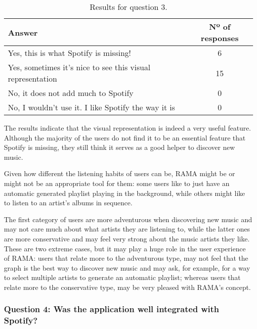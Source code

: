       \begin{table}[H]
         \begin{center}
           \begin{tabular}{l|c}
       
           \hline
           \textbf{Answer} & \textbf{Nº of responses} \\
           \hline

           \hline
            Yes, this is what Spotify is missing! & 6 \\
            Yes, sometimes it's nice to see this visual representation & 15 \\
            No, it does not add much to Spotify & 0 \\
            No, I wouldn't use it. I like Spotify the way it is & 0 \\
           \hline
           \end{tabular}
         \end{center}
         \caption{Results for question 3.}
         \label{tab:question3}
       \end{table}

      The results indicate that the visual representation is indeed a very useful feature.
      Although the majority of the users do not find it to be an essential feature that Spotify is missing, they still think it serves as a good helper to discover new music.

      Given how different the listening habits of users can be, RAMA might be or might not be an appropriate tool for them: some users like to just have an automatic generated playlist playing in the background, while others might like to listen to an artist's albums in sequence.

      The first category of users are more adventurous when discovering new music and may not care much about what artists they are listening to, while the latter ones are more conservative and may feel very strong about the music artists they like.
      These are two extreme cases, but it may play a huge role in the user experience of RAMA: users that relate more to the adventurous type, may not feel that the graph is the best way to discover new music and may ask, for example, for a way to select multiple artists to generate an automatic playlist; whereas users that relate more to the conservative type, may be very pleased with RAMA's concept.


    \subsubsection{Question 4: Was the application well integrated with Spotify?}
    \label{ssub:question_4}

